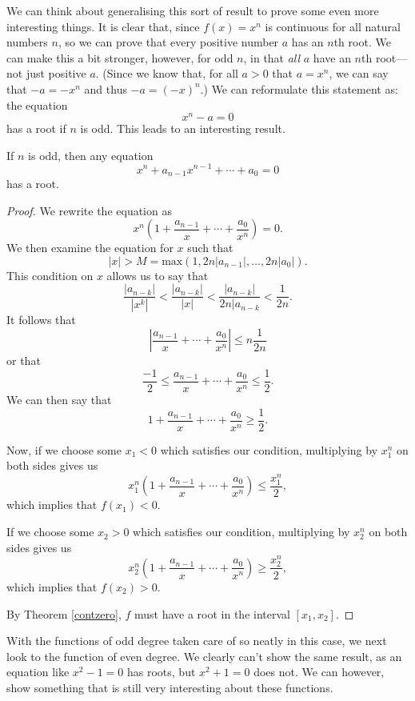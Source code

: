 We can think about generalising this sort of result to prove some even more interesting things. It is clear that, since $f(x) = x^n$ is continuous for all natural numbers $n$, so we can prove that every positive number $a$ has an $n$th root. We can make this a bit stronger, however, for odd $n$, in that \textit{all} $a$ have an $n$th root---not just positive $a$. (Since we know that, for all $a > 0$ that $a = x^n$, we can say that $-a = -x^n$ and thus $-a = (-x)^n$.) We can reformulate this statement as: the equation
\[ x^n - a = 0 \]
has a root if $n$ is odd. This leads to an interesting result.

\begin{theorem} \label{oddroot}
If $n$ is odd, then any equation
\[ x^n + a_{n-1}x^{n-1} + \cdots + a_0 = 0 \]
has a root.

\begin{proof}
We rewrite the equation as 
\[ x^n(1 + \frac{a_{n-1}}{x} + \cdots + \frac{a_0}{x^n}) = 0. \]
We then examine the equation for $x$ such that 
\[ |x| > M = \textrm{max}(1, 2n|a_{n-1}|, \ldots, 2n|a_0|). \]
This condition on $x$ allows us to say that
\[ \frac{|a_{n-k}|}{|x^k|} < \frac{|a_{n-k}|}{|x|} < \frac{|a_{n-k}|}{2n|a_{n-k}} < \frac{1}{2n}. \]
It follows that 
\[ |\frac{a_{n-1}}{x} + \cdots + \frac{a_0}{x^n}| \le n\frac{1}{2n} \]
or that
\[ \frac{-1}{2} \le \frac{a_{n-1}}{x} + \cdots + \frac{a_0}{x^n} \le \frac{1}{2}. \]
We can then say that
\[ 1 + \frac{a_{n-1}}{x} + \cdots + \frac{a_0}{x^n} \ge \frac{1}{2} .\]

Now, if we choose some $x_1 < 0$ which satisfies our condition, multiplying by $x_1^n$ on both sides gives us
\[ x_1^n(1 + \frac{a_{n-1}}{x} + \cdots + \frac{a_0}{x^n}) \le \frac{x_1^n}{2}, \]
which implies that $f(x_1) < 0$.

If we choose some $x_2 > 0$ which satisfies our condition, multiplying by $x_2^n$ on both sides gives us
\[ x_2^n(1 + \frac{a_{n-1}}{x} + \cdots + \frac{a_0}{x^n}) \ge \frac{x_2^n}{2}, \]
which implies that $f(x_2) > 0$.

By Theorem \ref{contzero}, $f$ must have a root in the interval $[x_1, x_2]$.
\end{proof}
\end{theorem}

With the functions of odd degree taken care of so neatly in this case, we next look to the function of even degree. We clearly can't show the same result, as an equation like $x^2 - 1 = 0$ has roots, but $x^2 + 1 = 0$ does not. We can however, show something that is still very interesting about these functions.

